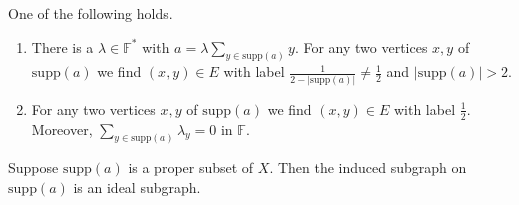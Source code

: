 \documentclass[10pt,a4paper]{amsart}
\begin{document}
\begin{lemma}\label{casesfora}
One of the following holds.
\begin{enumerate}
\item 
There is a $\lambda\in \mathbb{F}^*$ with $a=\lambda\displaystyle \sum_{y\in \mathrm{supp}(a)} y$.
For any two vertices $x,y$ of $\mathrm{supp}(a)$ we find $(x,y)\in E$ with label $\frac{1}{2-|\mathrm{supp}(a)|}\neq \frac{1}{2}$ and $|\mathrm{supp}(a)|>2$.
\item

For any two vertices $x,y$ of $\mathrm{supp}(a)$ we find $(x,y)\in E$ with label $\frac{1}{2}$.
Moreover, $\displaystyle\sum_{y\in \mathrm{supp}(a)} \lambda_y=0$ in $\mathbb{F}$.
\end{enumerate}
\end{lemma}

\begin{lemma}\label{proper}
Suppose $\mathrm{supp}(a)$ is a proper subset of $X$.
Then the induced subgraph on $\mathrm{supp}(a)$ is an ideal subgraph.
\end{lemma}
\end{document}
